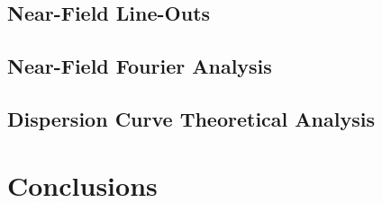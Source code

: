 \documentclass[preprint,
amsmath,amssymb,
aip,
jap,
floatfix,]{revtex4-2}
\begin{document}
			\subsection{Near-Field Line-Outs}
			\label{sec:L-O}

			\subsection{Near-Field Fourier Analysis}
			\label{sec:LOFA}		

			\subsection{Dispersion Curve Theoretical Analysis}
			\label{sec:DCTA}		

		\section{Conclusions}
		\label{sec:Con}


\end{document}
